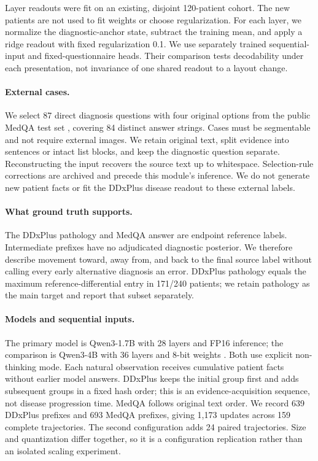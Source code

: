 \documentclass[11pt]{article}
\begin{document}
Layer readouts were fit on an existing, disjoint 120-patient cohort. The new patients are not used to fit weights or choose regularization. For each layer, we normalize the diagnostic-anchor state, subtract the training mean, and apply a ridge readout with fixed regularization 0.1. We use separately trained sequential-input and fixed-questionnaire heads. Their comparison tests decodability under each presentation, not invariance of one shared readout to a layout change.

\paragraph{External cases.}
We select 87 direct diagnosis questions with four original options from the public MedQA test set \citep{medqa}, covering 84 distinct answer strings. Cases must be segmentable and not require external images. We retain original text, split evidence into sentences or intact list blocks, and keep the diagnostic question separate. Reconstructing the input recovers the source text up to whitespace. Selection-rule corrections are archived and precede this module's inference. We do not generate new patient facts or fit the DDxPlus disease readout to these external labels.

\paragraph{What ground truth supports.}
The DDxPlus pathology and MedQA answer are endpoint reference labels. Intermediate prefixes have no adjudicated diagnostic posterior. We therefore describe movement toward, away from, and back to the final source label without calling every early alternative diagnosis an error. DDxPlus pathology equals the maximum reference-differential entry in 171/240 patients; we retain pathology as the main target and report that subset separately.

\paragraph{Models and sequential inputs.}
The primary model is Qwen3-1.7B with 28 layers and FP16 inference; the comparison is Qwen3-4B with 36 layers and 8-bit weights \citep{qwen3}. Both use explicit non-thinking mode. Each natural observation receives cumulative patient facts without earlier model answers. DDxPlus keeps the initial group first and adds subsequent groups in a fixed hash order; this is an evidence-acquisition sequence, not disease progression time. MedQA follows original text order. We record 639 DDxPlus prefixes and 693 MedQA prefixes, giving 1,173 updates across 159 complete trajectories. The second configuration adds 24 paired trajectories. Size and quantization differ together, so it is a configuration replication rather than an isolated scaling experiment.
\end{document}
